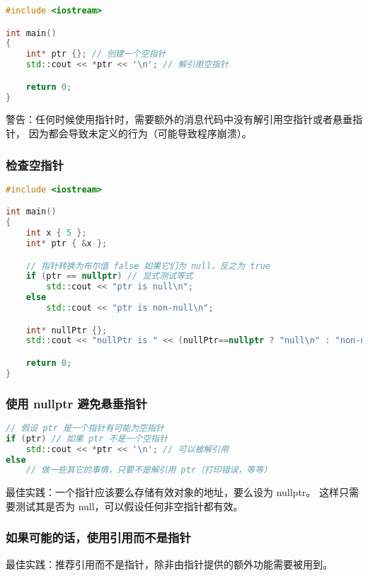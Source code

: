 \documentclass[../../LearnCpp.tex]{subfiles}
\begin{document}
\begin{lstlisting}[language=C++]
#include <iostream>

int main()
{
    int* ptr {}; // 创建一个空指针
    std::cout << *ptr << '\n'; // 解引用空指针

    return 0;
}
\end{lstlisting}

警告：任何时候使用指针时，需要额外的消息代码中没有解引用空指针或者悬垂指针，
因为都会导致未定义的行为（可能导致程序崩溃）。

\subsubsection*{检查空指针}

\begin{lstlisting}[language=C++]
#include <iostream>

int main()
{
    int x { 5 };
    int* ptr { &x };

    // 指针转换为布尔值 false 如果它们为 null，反之为 true
    if (ptr == nullptr) // 显式测试等式
        std::cout << "ptr is null\n";
    else
        std::cout << "ptr is non-null\n";

    int* nullPtr {};
    std::cout << "nullPtr is " << (nullPtr==nullptr ? "null\n" : "non-null\n"); // 显式测试等式

    return 0;
}
\end{lstlisting}

\subsubsection*{使用 nullptr 避免悬垂指针}

\begin{lstlisting}[language=C++]
// 假设 ptr 是一个指针有可能为空指针
if (ptr) // 如果 ptr 不是一个空指针
    std::cout << *ptr << '\n'; // 可以被解引用
else
    // 做一些其它的事情，只要不是解引用 ptr（打印错误，等等）
\end{lstlisting}

最佳实践：一个指针应该要么存储有效对象的地址，要么设为 nullptr。
这样只需要测试其是否为 null，可以假设任何非空指针都有效。

\subsubsection*{如果可能的话，使用引用而不是指针}

最佳实践：推荐引用而不是指针，除非由指针提供的额外功能需要被用到。
\end{document}
